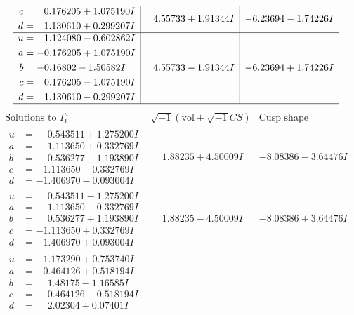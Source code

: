 \documentclass[1p]{elsarticle_modified}
\theoremstyle{definition}
\newcommand{\I}{\sqrt{-1}}
\begin{document}
$$\begin{array}{c|c|c}
\begin{aligned}
c &= \phantom{-}0.176205 + 1.075190 I \\
d &= \phantom{-}1.130610 + 0.299207 I\end{aligned}
 & \phantom{-}4.55733 + 1.91344 I & -6.23694 - 1.74226 I \\ \hline\begin{aligned}
u &= \phantom{-}1.124080 - 0.602862 I \\
a &= -0.176205 + 1.075190 I \\
b &= -0.16802 - 1.50582 I \\
c &= \phantom{-}0.176205 - 1.075190 I \\
d &= \phantom{-}1.130610 - 0.299207 I\end{aligned}
 & \phantom{-}4.55733 - 1.91344 I & -6.23694 + 1.74226 I\\
 \hline 
 \end{array}$$\newpage$$\begin{array}{c|c|c}  
\text{Solutions to }I^u_{1}& \I (\text{vol} + \sqrt{-1}CS) & \text{Cusp shape}\\
 \hline 
\begin{aligned}
u &= \phantom{-}0.543511 + 1.275200 I \\
a &= \phantom{-}1.113650 + 0.332769 I \\
b &= \phantom{-}0.536277 - 1.193890 I \\
c &= -1.113650 - 0.332769 I \\
d &= -1.406970 - 0.093004 I\end{aligned}
 & \phantom{-}1.88235 + 4.50009 I & -8.08386 - 3.64476 I \\ \hline\begin{aligned}
u &= \phantom{-}0.543511 - 1.275200 I \\
a &= \phantom{-}1.113650 - 0.332769 I \\
b &= \phantom{-}0.536277 + 1.193890 I \\
c &= -1.113650 + 0.332769 I \\
d &= -1.406970 + 0.093004 I\end{aligned}
 & \phantom{-}1.88235 - 4.50009 I & -8.08386 + 3.64476 I \\ \hline\begin{aligned}
u &= -1.173290 + 0.753740 I \\
a &= -0.464126 + 0.518194 I \\
b &= \phantom{-}1.48175 - 1.16585 I \\
c &= \phantom{-}0.464126 - 0.518194 I \\
d &= \phantom{-}2.02304 + 0.07401 I\end{aligned}

\end{array}$$
\end{document}
